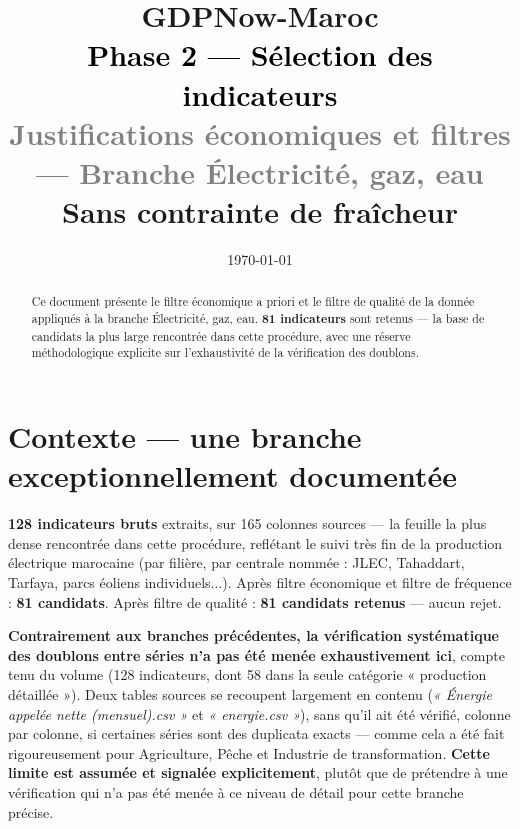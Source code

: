 \documentclass[11pt,a4paper]{article}
\title{\vspace{-1.3cm}\textcolor{bleuprincip}{\Huge\bfseries GDPNow-Maroc}\\[0.3cm]
\textcolor{black}{\Large Phase 2 --- Sélection des indicateurs}\\[0.15cm]
\textcolor{gray}{\large Justifications économiques et filtres --- Branche Électricité, gaz, eau}\\[0.1cm]
\textcolor{orangealerte}{\normalsize Sans contrainte de fraîcheur}}
\author{}
\date{\today}
\begin{document}
\maketitle
\thispagestyle{empty}

\begin{abstract}
\noindent Ce document présente le filtre économique a priori et le filtre de qualité de la donnée appliqués à la branche Électricité, gaz, eau. \textbf{81 indicateurs} sont retenus --- la base de candidats la plus large rencontrée dans cette procédure, avec une réserve méthodologique explicite sur l'exhaustivité de la vérification des doublons.
\end{abstract}

\tableofcontents
\vspace{0.3cm}

\section{Contexte --- une branche exceptionnellement documentée}

\begin{fichebox}
\textbf{128 indicateurs bruts} extraits, sur 165 colonnes sources --- la feuille la plus dense rencontrée dans cette procédure, reflétant le suivi très fin de la production électrique marocaine (par filière, par centrale nommée : JLEC, Tahaddart, Tarfaya, parcs éoliens individuels...). Après filtre économique et filtre de fréquence : \textbf{81 candidats}. Après filtre de qualité : \textbf{81 candidats retenus} --- aucun rejet.
\end{fichebox}

\begin{alertebox}
\textbf{Contrairement aux branches précédentes, la vérification systématique des doublons entre séries n'a pas été menée exhaustivement ici}, compte tenu du volume (128 indicateurs, dont 58 dans la seule catégorie « production détaillée »). Deux tables sources se recoupent largement en contenu (\textit{« Énergie appelée nette (mensuel).csv »} et \textit{« energie.csv »}), sans qu'il ait été vérifié, colonne par colonne, si certaines séries sont des duplicata exacts --- comme cela a été fait rigoureusement pour Agriculture, Pêche et Industrie de transformation. \textbf{Cette limite est assumée et signalée explicitement}, plutôt que de prétendre à une vérification qui n'a pas été menée à ce niveau de détail pour cette branche précise.
\end{alertebox}
\end{document}
